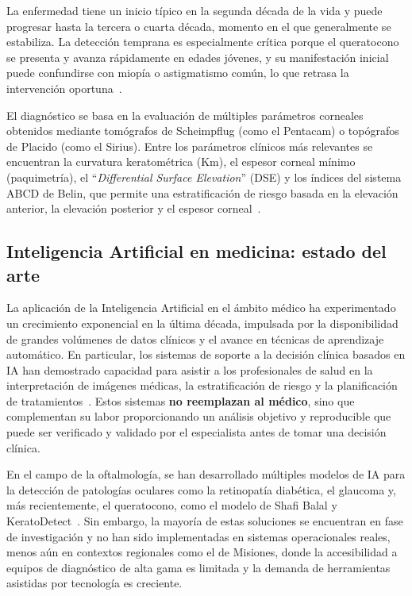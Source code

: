         La enfermedad tiene un inicio típico en la segunda década de la vida y puede progresar hasta la tercera o cuarta década, momento en el que generalmente se estabiliza. La detección temprana es especialmente crítica porque el queratocono se presenta y avanza rápidamente en edades jóvenes, y su manifestación inicial puede confundirse con miopía o astigmatismo común, lo que retrasa la intervención oportuna~.

        El diagnóstico se basa en la evaluación de múltiples parámetros corneales obtenidos mediante tomógrafos de Scheimpflug (como el Pentacam) o topógrafos de Placido (como el Sirius). Entre los parámetros clínicos más relevantes se encuentran la curvatura keratométrica (Km), el espesor corneal mínimo (paquimetría), el ``\textit{Differential Surface Elevation}'' (DSE) y los índices del sistema ABCD de Belin, que permite una estratificación de riesgo basada en la elevación anterior, la elevación posterior y el espesor corneal~.

    \subsection{Inteligencia Artificial en medicina: estado del arte}

        La aplicación de la Inteligencia Artificial en el ámbito médico ha experimentado un crecimiento exponencial en la última década, impulsada por la disponibilidad de grandes volúmenes de datos clínicos y el avance en técnicas de aprendizaje automático. En particular, los sistemas de soporte a la decisión clínica basados en IA han demostrado capacidad para asistir a los profesionales de salud en la interpretación de imágenes médicas, la estratificación de riesgo y la planificación de tratamientos~. Estos sistemas \textbf{no reemplazan al médico}, sino que complementan su labor proporcionando un análisis objetivo y reproducible que puede ser verificado y validado por el especialista antes de tomar una decisión clínica.

        En el campo de la oftalmología, se han desarrollado múltiples modelos de IA para la detección de patologías oculares como la retinopatía diabética, el glaucoma y, más recientemente, el queratocono, como el modelo de Shafi Balal y KeratoDetect~. Sin embargo, la mayoría de estas soluciones se encuentran en fase de investigación y no han sido implementadas en sistemas operacionales reales, menos aún en contextos regionales como el de Misiones, donde la accesibilidad a equipos de diagnóstico de alta gama es limitada y la demanda de herramientas asistidas por tecnología es creciente.

